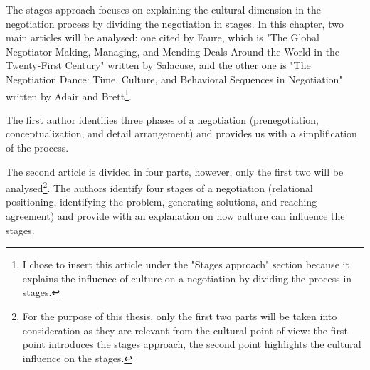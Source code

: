 \documentclass[../main.tex]{subfiles}
\begin{document}
The stages approach focuses on explaining the cultural dimension in the negotiation process by dividing the negotiation in stages. In this chapter, two main articles will be analysed: one cited by Faure, which is "The Global Negotiator Making, Managing, and Mending Deals Around the World in the Twenty-First Century" written by Salacuse, and the other one is "The Negotiation Dance: Time, Culture, and Behavioral Sequences in Negotiation" written by Adair and Brett\footnote{I chose to insert this article under the "Stages approach" section because it explains the influence of culture on a negotiation by dividing the process in stages.}. 

The first author identifies three phases of a negotiation (prenegotiation, conceptualization, and detail arrangement) and provides us with a simplification of the process.

The second article is divided in four parts, however, only the first two will be analysed\footnote{For the purpose of this thesis, only the first two parts will be taken into consideration as they are relevant from the cultural point of view: the first point introduces the stages approach, the second point highlights the cultural influence on the stages.}. The authors identify four stages of a negotiation (relational positioning, identifying the problem, generating solutions, and reaching agreement) and provide with an explanation on how culture can influence the stages.\\
\end{document}

